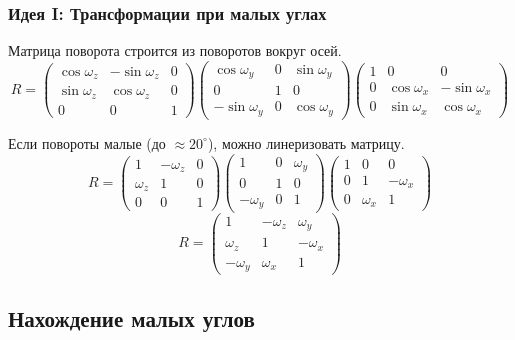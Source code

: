 \documentclass{beamer}
\begin{document}
\begin{frame}
\frametitle{Идея I: Трансформации при малых углах}
	Матрица поворота строится из поворотов вокруг осей.
	$$R = 
	\begin{pmatrix} 
	\cos{\omega_z} & -\sin{\omega_z} & 0 \\
	\sin{\omega_z} & \cos{\omega_z} & 0 \\
	0 & 0 & 1
	\end{pmatrix}
	\begin{pmatrix} 
	\cos{\omega_y} & 0 & \sin{\omega_y} \\
	0 & 1 & 0 \\
	-\sin{\omega_y} & 0 & \cos{\omega_y}
	\end{pmatrix}
	\begin{pmatrix} 
	1 & 0 & 0 \\
	0 & \cos{\omega_x} & -\sin{\omega_x} \\
	0 & \sin{\omega_x} & \cos{\omega_x}
	\end{pmatrix}$$
	
	Если повороты малые (до $\approx 20^\circ$), можно линеризовать матрицу.
	$$ R = 
	\begin{pmatrix} 
	1 & -\omega_z & 0 \\
	\omega_z & 1 & 0 \\
	0 & 0 & 1
	\end{pmatrix}
	\begin{pmatrix} 
	1 & 0 & \omega_y \\
	0 & 1 & 0 \\
	-\omega_y & 0 & 1 
	\end{pmatrix}
	\begin{pmatrix} 
	1 & 0 & 0 \\
	0 & 1 & -\omega_x \\
	0 & \omega_x & 1
	\end{pmatrix}$$
	$$R = \begin{pmatrix} 
	1 & -\omega_z & \omega_y \\
	\omega_z & 1 & -\omega_x \\
	-\omega_y & \omega_x & 1
	\end{pmatrix}$$
\end{frame}

\subsection{Нахождение малых углов}
\end{document}
